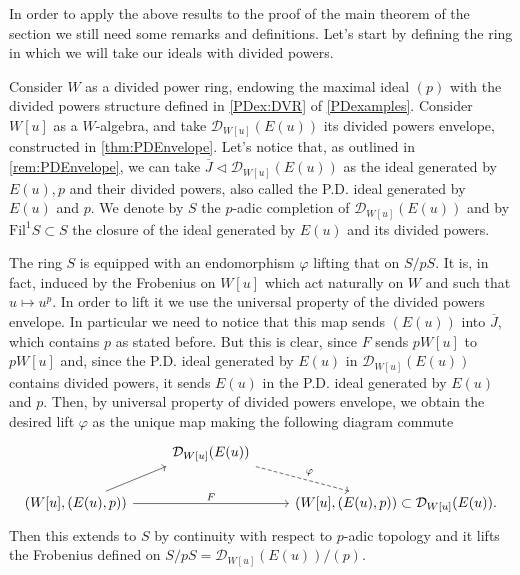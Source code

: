\noindent
In order to apply the above results to the proof of the main theorem of the section
we still need some remarks and definitions.
Let's start by defining the ring in which we will take
our ideals with divided powers.
\begin{defn}[]
	Consider $W$ as a divided power ring, endowing the maximal ideal $(p)$
	with the divided powers structure defined in \cref{PDex:DVR} of \cref{PDexamples}.
	Consider $W[u]$ as a $W$-algebra, and take $\mathcal{D}_{W[u]}(E(u))$
	its divided powers envelope, constructed in \cref{thm:PDEnvelope}.
	Let's notice that, as outlined in \cref{rem:PDEnvelope},
	we can take $\overline{J} \triangleleft \mathcal{D}_{W[u]}(E(u))$ 
	as the ideal generated by $E(u), p$ and their divided powers,
	also called the P.D. ideal generated by $E(u)$ and $p$.
	We denote by $S$ the $p$-adic completion of $\mathcal{D}_{W[u]}(E(u))$
	and by $\mathrm{Fil}^1 S \subset S$ the closure of the ideal
	generated by $E(u)$ and its divided powers.
\end{defn}


\begin{rem}[]\label{rem:liftFrobeniusS}
	The ring $S$ is equipped with an endomorphism $\varphi$ lifting that on $S/pS$.
	It is, in fact, induced by the Frobenius on $W[u]$ which act naturally
	on $W$ and such that $u \mapsto u^p$.
	In order to lift it we use the universal property of
	the divided powers envelope.
	In particular we need to notice that this map sends $(E(u))$
	into $\overline{J}$, which contains $p$ as stated before.
	But this is clear, since $F$ sends $pW[u]$ to $pW[u]$ and, 
	since the P.D. ideal generated by $E(u)$ in $\mathcal{D}_{W[u]}(E(u))$
	contains divided powers, it sends $E(u)$ in the P.D. ideal
	generated by $E(u)$ and $p$.
	Then, by universal property of divided powers envelope, we obtain the desired 
	lift $\varphi$ as the unique map making the following diagram commute
	\begin{equation*}
	\begin{tikzcd}
		&
		\mathcal{D}_{W[u]}(E(u))
		\arrow[rd, "\varphi", dashrightarrow,
		start anchor=south east] & \\
		\left( W[u], (E(u),p)\right) \arrow[ru, "", rightarrow,
		end anchor=south west] 
		\arrow[rr, "F", rightarrow] & &
		\left( W[u], (E(u),p)\right) \subset
		\mathcal{D}_{W[u]}(E(u)). 
	\end{tikzcd}
	\end{equation*}
	Then this extends to $S$ by continuity with respect to $p$-adic
	topology and it lifts the Frobenius defined on
	$S/pS = \mathcal{D}_{W[u]}(E(u))/ (p)$.
\end{rem}


